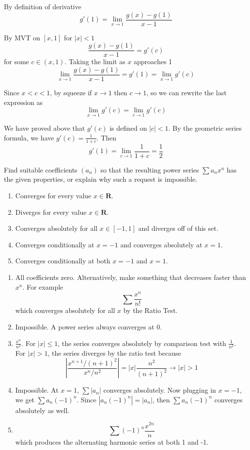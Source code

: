 \documentclass{oxmathproblems}
\begin{document}
\begin{questions}
\begin{solution}
\begin{enumerate}[label=(\alph*)]
    By definition of derivative
    \[g'(1) = \lim_{x \to 1}\frac{g(x)-g(1)}{x-1}\]

    By MVT on $[x, 1]$ for $|x| < 1$
    \[\frac{g(x)-g(1)}{x-1} = g'(c)\]
    for some $c \in (x, 1)$. Taking the limit as $x$ approaches 1
    \[\lim_{x \to 1}\frac{g(x)-g(1)}{x-1} = g'(1) = \lim_{x \to 1}g'(c)\]

    Since $x < c < 1$, by squeeze if $x \to 1$ then $c \to 1$, so we can rewrite the last expression as
    \[\lim_{x \to 1}g'(c) = \lim_{c \to 1}g'(c)\]

    We have proved above that $g'(c)$ is defined on $|c| < 1$. By the geometric series formula, we have $g'(c) = \frac{1}{1+c}$. Then
    \[g'(1) = \lim_{c \to 1}\frac{1}{1+c} = \frac{1}{2}\]
  \end{enumerate}
\end{solution}

\miquestion Find suitable coefficients $(a_{n})$ so that the resulting power series $\sum a_{n}x^{n}$ has the given properties, or explain why such a
request is impossible.
\begin{enumerate}[label=(\alph*)]
  \item Converges for every value $x \in \textbf{R}$.
  \item Diverges for every value $x \in \textbf{R}$.
  \item Converges absolutely for all $x \in [-1, 1]$ and diverges off of this set.
  \item Converges conditionally at $x=-1$ and converges absolutely at $x=1$.
  \item Converges conditionally at both $x=-1$ and $x=1$.
\end{enumerate}

\begin{solution}
  \begin{enumerate}[label=(\alph*)]
    \item All coefficients zero. Alternatively, make something that decreases faster than $x^{n}$. For example
    \[\sum \frac{x^{n}}{n!}\]
    which converges absolutely for all $x$ by the Ratio Test.
    \item Impossible. A power series always converges at 0.
    \item $\frac{x^{n}}{n^2}$. For $|x| \leq 1$, the series converges absolutely by comparison test with $\frac{1}{n^2}$. For $|x| > 1$, the series diverges
    by the ratio test because
    \[\left| \frac{x^{n+1}/(n+1)^2}{x^n/n^2} \right| = |x|\frac{n^2}{(n+1)^2} \to |x| > 1\]
    \item Impossible. At $x=1$, $\sum |a_{n}|$ converges absolutely. Now plugging in $x=-1$, we get $\sum a_{n}(-1)^{n}$. Since $|a_{n}(-1)^{n}|=|a_{n}|$,
    then $\sum a_{n}(-1)^{n}$ converges absolutely as well.
    \item \[\sum (-1)^{n}\frac{x^{2n}}{n}\]
    which produces the alternating harmonic series at both 1 and -1.
  \end{enumerate}
\end{solution}


\end{questions}
\end{document}
